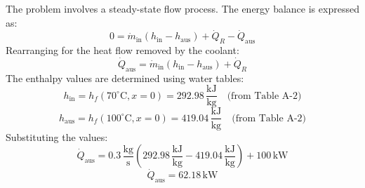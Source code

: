 The problem involves a steady-state flow process. The energy balance is expressed as:  
\[
0 = \dot{m}_{\text{in}} (h_{\text{in}} - h_{\text{aus}}) + \dot{Q}_R - \dot{Q}_{\text{aus}}
\]  
Rearranging for the heat flow removed by the coolant:  
\[
\dot{Q}_{\text{aus}} = \dot{m}_{\text{in}} (h_{\text{in}} - h_{\text{aus}}) + \dot{Q}_R
\]  
The enthalpy values are determined using water tables:  
\[
h_{\text{in}} = h_f(70^\circ\text{C}, x = 0) = 292.98 \, \frac{\text{kJ}}{\text{kg}} \quad \text{(from Table A-2)}
\]  
\[
h_{\text{aus}} = h_f(100^\circ\text{C}, x = 0) = 419.04 \, \frac{\text{kJ}}{\text{kg}} \quad \text{(from Table A-2)}
\]  
Substituting the values:  
\[
\dot{Q}_{\text{aus}} = 0.3 \, \frac{\text{kg}}{\text{s}} \left(292.98 \, \frac{\text{kJ}}{\text{kg}} - 419.04 \, \frac{\text{kJ}}{\text{kg}}\right) + 100 \, \text{kW}
\]  
\[
\dot{Q}_{\text{aus}} = 62.18 \, \text{kW}
\]